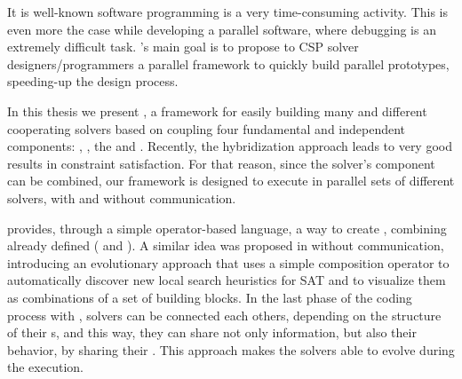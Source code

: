 It is well-known software programming is a very time-consuming activity. This is even more the case while developing a parallel software, where debugging is an extremely difficult task. \posl{}'s main goal is to propose to CSP solver designers/programmers a parallel framework to quickly build parallel prototypes, speeding-up the design process. 

In this thesis we present \posl, a framework for easily building many and different cooperating solvers based on coupling four fundamental and independent components: \oms, \opchs, the \ass{} and \comstrs. Recently, the hybridization approach leads to very good results in constraint satisfaction. For that reason, since the solver's component can be combined, our framework is designed to execute in parallel sets of different solvers, with and without communication.

\posl{} provides, through a simple operator-based language, a way to create \ass, combining already defined \ms{} (\oms{} and \opchs). A similar idea was proposed in \cite{Fukunaga2008} without communication, introducing an evolutionary approach that uses a simple composition operator to automatically discover new local search heuristics for SAT and to  visualize them as combinations of a set of building blocks. 
In the last phase of the coding process with \posl{}, solvers can be connected each others, depending on the structure of their \opch s, and this way, they can share not only information, but also their behavior, by sharing their \oms. This approach makes the solvers able to evolve during the execution.